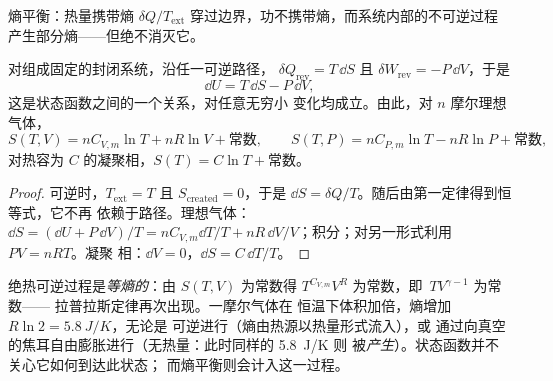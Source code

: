 \begin{omfigure}

{\small 熵平衡：热量携带熵 $\delta Q/T_{\mathrm{ext}}$
穿过边界，功不携带熵，而系统内部的不可逆过程
产生部分熵——但绝不消灭它。}
\end{omfigure}

\begin{proposition}\label{prop:b1:second-law-entropy:identity}
对组成固定的封闭系统，沿任一可逆路径，
$\delta Q_{\mathrm{rev}} = T\,\dd S$ 且 $\delta W_{\mathrm{rev}} = -P\,\dd V$，于是
\[
\dd U = T\,\dd S - P\,\dd V ,
\]
这是状态函数之间的一个关系，对任意无穷小
变化均成立。由此，对 $n$ 摩尔理想气体，
\[
S(T, V) = nC_{V,m}\ln T + nR\ln V + \text{常数}, \qquad
S(T, P) = nC_{P,m}\ln T - nR\ln P + \text{常数},
\]
对热容为 $C$ 的凝聚相，$S(T) = C\ln T + \text{常数}$。
\end{proposition}

\begin{proof}
可逆时，$T_{\mathrm{ext}} = T$ 且 $S_{\mathrm{created}} = 0$，于是 $\dd S =
\delta Q/T$。随后由第一定律得到恒等式，它不再
依赖于路径。理想气体：$\dd S = (\dd U + P\,\dd V)/T = nC_{V,m}\dd T/T
+ nR\,\dd V/V$；积分；对另一形式利用 $PV = nRT$。凝聚
相：$\dd V = 0$，$\dd S = C\,\dd T/T$。
\end{proof}

\begin{example}[读懂这些公式]\label{ex:b1:second-law-entropy:formulas}
绝热可逆过程是\emph{等熵的}：由 $S(T, V)$
为常数得 $T^{C_{V,m}}V^R$ 为常数，即\ $TV^{\gamma - 1}$ 为常数——
拉普拉斯定律再次出现。一摩尔气体在
恒温下体积加倍，熵增加 $R\ln2 = \qty{5.8}{J/K}$，无论是
可逆进行（熵由热源以热量形式流入），或
通过向真空的焦耳自由膨胀进行（无热量：此时同样的 \qty{5.8}{J/K} 则
被\emph{产生}）。状态函数并不关心它如何到达此状态；
而熵平衡则会计入这一过程。
\end{example}

